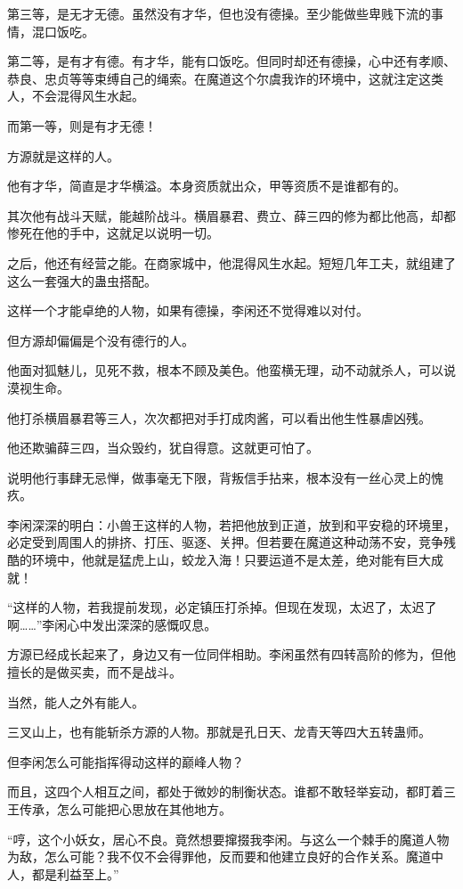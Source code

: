 \begin{this_body}
第三等，是无才无德。虽然没有才华，但也没有德操。至少能做些卑贱下流的事情，混口饭吃。

第二等，是有才有德。有才华，能有口饭吃。但同时却还有德操，心中还有孝顺、恭良、忠贞等等束缚自己的绳索。在魔道这个尔虞我诈的环境中，这就注定这类人，不会混得风生水起。

而第一等，则是有才无德！

方源就是这样的人。

他有才华，简直是才华横溢。本身资质就出众，甲等资质不是谁都有的。

其次他有战斗天赋，能越阶战斗。横眉暴君、费立、薛三四的修为都比他高，却都惨死在他的手中，这就足以说明一切。

之后，他还有经营之能。在商家城中，他混得风生水起。短短几年工夫，就组建了这么一套强大的蛊虫搭配。

这样一个才能卓绝的人物，如果有德操，李闲还不觉得难以对付。

但方源却偏偏是个没有德行的人。

他面对狐魅儿，见死不救，根本不顾及美色。他蛮横无理，动不动就杀人，可以说漠视生命。

他打杀横眉暴君等三人，次次都把对手打成肉酱，可以看出他生性暴虐凶残。

他还欺骗薛三四，当众毁约，犹自得意。这就更可怕了。

说明他行事肆无忌惮，做事毫无下限，背叛信手拈来，根本没有一丝心灵上的愧疚。

李闲深深的明白：小兽王这样的人物，若把他放到正道，放到和平安稳的环境里，必定受到周围人的排挤、打压、驱逐、关押。但若要在魔道这种动荡不安，竞争残酷的环境中，他就是猛虎上山，蛟龙入海！只要运道不是太差，绝对能有巨大成就！

“这样的人物，若我提前发现，必定镇压打杀掉。但现在发现，太迟了，太迟了啊……”李闲心中发出深深的感慨叹息。

方源已经成长起来了，身边又有一位同伴相助。李闲虽然有四转高阶的修为，但他擅长的是做买卖，而不是战斗。

当然，能人之外有能人。

三叉山上，也有能斩杀方源的人物。那就是孔日天、龙青天等四大五转蛊师。

但李闲怎么可能指挥得动这样的巅峰人物？

而且，这四个人相互之间，都处于微妙的制衡状态。谁都不敢轻举妄动，都盯着三王传承，怎么可能把心思放在其他地方。

“哼，这个小妖女，居心不良。竟然想要撺掇我李闲。与这么一个棘手的魔道人物为敌，怎么可能？我不仅不会得罪他，反而要和他建立良好的合作关系。魔道中人，都是利益至上。”


\end{this_body}
